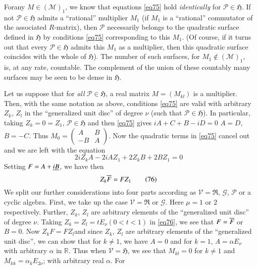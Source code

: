 For\pageoriginale any $M\in(\mathscr{M})_{1}$, we know that equations
\eqref{eq75} hold {\em identically} for $\mathscr{P}\in\mathfrak{H}$. If
not $\mathscr{P}\in\mathfrak{H}$ admits a ``rational'' multiplier
$M_{1}$ (\ie if $M_{1}$ is a ``rational'' commutator of the associated
$R$-matrix), then $\mathscr{P}$ necessarily belongs to the quadratic
surface defined in $\mathfrak{H}$ by conditions \eqref{eq75}
corresponding to this $M_{1}$. (Of course, if it turns out that every
$\mathscr{P}\in\mathfrak{H}$ admits this $M_{1}$ as a multiplier, then
this quadratic surface coincides with the whole of
$\mathfrak{H}$). The  number of such surfaces, for $M_{1}\not\in
(\mathscr{M})_{1}$, is, at any rate, countable. The complement of the
union of these countably many surfaces may be seen to be dense in
$\mathfrak{H}$. 

Let us suppose that for {\em all} $\mathscr{P}\in\mathfrak{H}$, a real
matrix $M=(M_{kl})$ is a multiplier. Then, with the same notation as
above, conditions \eqref{eq75} are valid with arbitrary $Z_{k}$, $Z_{l}$
in the ``generalized unit disc'' of degree $\nu$ (such that
$\mathscr{P}\in\mathfrak{H}$). In particular, taking $Z_{k}=0=Z_{1}$,
$\mathscr{P}\in\mathfrak{H}$ and then \eqref{eq75} gives $iA+C+B-iD=0$
\ie $A=D$, $B=-C$. Thus $M_{0}=\left(\begin{smallmatrix} A & B\\ -B &
  A
\end{smallmatrix}\right)$. Now the quadratic terms in \eqref{eq75}
cancel out and we are left with the equation
$$
2iZ_{k}A-2iAZ_{1}+2Z_{k}B+2BZ_{1}=0
$$
Setting $F=A+\underline{iB}$, we have then
\begin{equation*}
Z_{k}\overline{F}=FZ_{1}\tag{76}\label{eq76}
\end{equation*}
We split our further considerations into four parts according as
$\mathscr{V}=\mathfrak{R}$, $\mathscr{G}$, $\mathscr{P}$ or a cyclic
algebra. First, we take up the case
$\underline{\mathscr{V}=\mathfrak{R} \text{ or } \mathscr{G}}$. Here
$\mu=1$ or $2$ respectively. Further, $Z_{k}$, $Z_{l}$ are arbitrary
elements of the ``generalized unit disc'' of degree $\nu$. Taking
$Z_{k}=Z_{l}=tE_{\nu}(0<t<1)$ in \eqref{eq76}, we see that $F=\overline{F}$ or
$B=0$. Now $Z_{k}F=FZ_{l}$\pageoriginale and since $Z_{k}$, $Z_{l}$
are arbitrary elements of the ``generalized unit disc'', we can show
that for $k\neq 1$, we have $A=0$ and for $k=1$, $A=\alpha E_{\nu}$
with arbitrary $\alpha$ in $\mathbb{R}$. Thus when
$\mathscr{V}=\mathfrak{H}$, we see that $M_{kl}=0$ for $k\neq 1$ and
$M_{kk}=\alpha_{k}E_{2\nu}$; with arbitrary real $\alpha$. For
